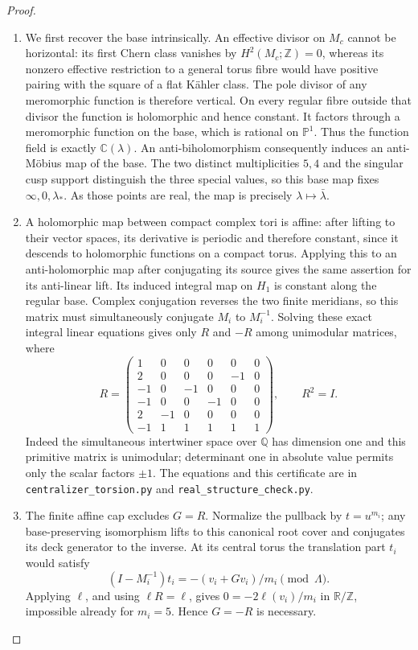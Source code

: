 \documentclass[11pt,a4paper]{article}
\theoremstyle{definition}
\begin{document}
\begin{proof}
\begin{enumerate}[label=\arabic*.]
\item We first recover the base intrinsically.  An effective divisor on
$M_c$ cannot be horizontal: its first Chern class vanishes by
$H^2(M_c;\mathbb Z)=0$, whereas its nonzero effective restriction to a
general torus fibre would have positive pairing with the square of a
flat K\"ahler class.  The pole divisor of any meromorphic function is
therefore vertical.  On every regular fibre outside that divisor the
function is holomorphic and hence constant.  It factors through a
meromorphic function on the base, which is rational on
$\mathbb P^1$.  Thus the function field is exactly $\mathbb C(\lambda)$.
An anti-biholomorphism consequently induces an anti-M\"obius map of
the base.  The two distinct multiplicities $5,4$ and the singular cusp
support distinguish the three special values, so this base map fixes
$\infty,0,\lambda_*$.  As those points are real, the map is precisely
$\lambda\mapsto\bar\lambda$.

\item A holomorphic map between compact complex tori is affine: after
lifting to their vector spaces, its derivative is periodic and
therefore constant, since it descends to holomorphic functions on a
compact torus.  Applying this to an anti-holomorphic map after
conjugating its source gives the same assertion for its anti-linear
lift.  Its induced integral map on $H_1$ is constant along the
regular base.  Complex conjugation reverses the two finite meridians,
so this matrix must simultaneously conjugate $M_i$ to $M_i^{-1}$.
Solving these exact integral linear equations gives only $R$ and
$-R$ among unimodular matrices, where
\[
R=\begin{pmatrix}
1&0&0&0&0&0\\
2&0&0&0&-1&0\\
-1&0&-1&0&0&0\\
-1&0&0&-1&0&0\\
2&-1&0&0&0&0\\
-1&1&1&1&1&1
\end{pmatrix},\qquad R^2=I.
\]
Indeed the simultaneous intertwiner space over $\mathbb Q$ has
dimension one and this primitive matrix is unimodular; determinant
one in absolute value permits only the scalar factors $\pm1$.
The equations and this certificate are in
\texttt{centralizer\_torsion.py} and
\texttt{real\_structure\_check.py}.

\item The finite affine cap excludes $G=R$.  Normalize the pullback by
$t=u^{m_i}$; any base-preserving isomorphism lifts to this canonical
root cover and conjugates its deck generator to the inverse.
At its central torus the translation part $t_i$ would satisfy
\[
(I-M_i^{-1})t_i=-(v_i+Gv_i)/m_i\pmod\Lambda.
\]
Applying $\ell$, and using $\ell R=\ell$, gives
$0=-2\ell(v_i)/m_i$ in $\mathbb R/\mathbb Z$, impossible already
for $m_i=5$.  Hence $G=-R$ is necessary.


\end{enumerate}
\end{proof}
\end{document}
